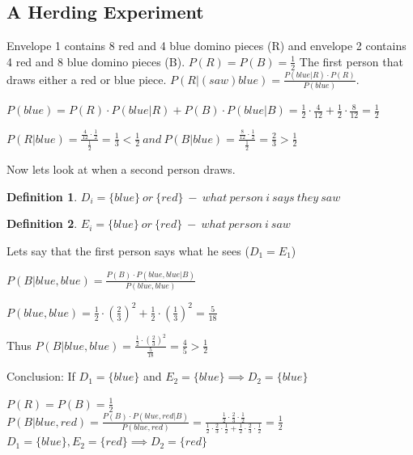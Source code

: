 \documentclass[12pt]{scrartcl}
\newtheorem{defi}{Definition}
\begin{document}
\subsection{A Herding Experiment}
Envelope 1 contains 8 red and 4 blue domino pieces (R) and envelope 2 contains 4 red and 8 blue domino pieces (B).\newline
$P(R) = P(B) = \frac{1}{2} $\newline
The first person that draws either a red or blue piece.\newline
$P(R | (saw) blue) = \frac{P(blue | R)\cdot P(R)}{P(blue)}$.

\noindent$P(blue) = P(R)\cdot P(blue |R) + P(B)\cdot P(blue | B) = \frac{1}{2}\cdot \frac{4}{12} + \frac{1}{2}\cdot \frac{8}{12} = \frac{1}{2}$

\noindent$P(R | blue) = \frac{\frac{4}{12}\cdot \frac{1}{2}}{\frac{1}{2}} = \frac{1}{3} < \frac{1}{2}\
 and\ P(B | blue) = \frac{\frac{8}{12}\cdot \frac{1}{2}}{\frac{1}{2}} = \frac{2}{3} > \frac{1}{2}$



\noindent Now lets look at when a second person draws.
\begin{defi}
	$D_{i} = \{blue\}\ or\ \{red\}\ -\ what\ person\ i\ says\ they\ saw$
\end{defi}
\begin{defi}
$E_{i} = \{blue\}\ or\ \{red\}\ -\ what\ person\ i\ saw$
\end{defi}
\noindent Lets say that the first person says what he sees ($D_{1} = E_{1}$)

\noindent$P(B | blue, blue) = \frac{P(B)\cdot P(blue, blue | B)}{P(blue, blue)}$

\noindent$P(blue, blue) = \frac{1}{2}\cdot (\frac{2}{3})^{2} + \frac{1}{2}\cdot (\frac{1}{3})^{2} = \frac{5}{18}$

\noindent Thus $P(B | blue, blue) = \frac{\frac{1}{2}\cdot (\frac{2}{3})^{2}}{\frac{5}{18}} = \frac{4}{5} > \frac{1}{2}$

\noindent Conclusion: If $D_{1} = \{blue\}$ and $E_{2} = \{blue\} \implies D_{2} = \{blue \}$\newline

\noindent $P(R) = P(B) = \frac{1}{2}$\\
$P(B | blue, red) = \frac{P(B)\cdot P(blue, red | B)}{P(blue, red)} = \frac{\frac{1}{2}\cdot \frac{2}{3}\cdot \frac{1}{2}}{ \frac{1}{2}\cdot \frac{2}{3}\cdot \frac{1}{2} + \frac{1}{2}\cdot \frac{2}{3}\cdot \frac{1}{2}} = \frac{1}{2}$\\
$D_{1} = \{blue\}, E_{2} = \{red\} \implies D_{2} = \{red\}$
\end{document}
